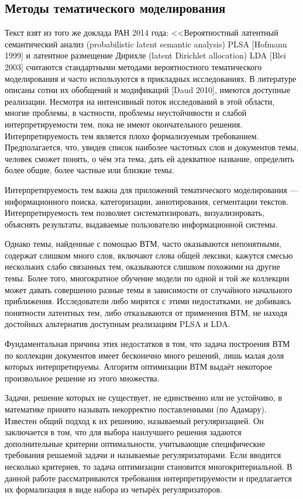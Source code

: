 \documentclass[a4paper,14pt]{extarticle}
\begin{document}
\subsection{Методы тематического моделирования}
Текст взят из того же доклада РАН 2014 года: <<Вероятностный латентный семантический анализ (probabilistic latent semantic
analysis) PLSA [Hofmann 1999] и латентное размещение Дирихле (latent Dirichlet
allocation) LDA [Blei 2003] считаются стандартными методами вероятностного
тематического моделирования и часто используются в прикладных исследованиях.
В литературе описаны сотни их обобщений и модификаций [Daud 2010], имеются
доступные реализации. Несмотря на интенсивный поток исследований в этой
области, многие проблемы, в частности, проблемы неустойчивости и слабой
интерпретируемости тем, пока не имеют окончательного решения.
Интерпретируемость тем является плохо формализуемым требованием.
Предполагается, что, увидев список наиболее частотных слов и документов темы,
человек сможет понять, о чём эта тема, дать ей адекватное название, определить
более общие, более частные или близкие темы.

 Интерпретируемость тем важна для
приложений тематического моделирования — информационного поиска,
категоризации, аннотирования, сегментации текстов. Интерпретируемость тем
позволяет систематизировать, визуализировать, объяснять результаты,
выдаваемые пользователю информационной системы.


Однако темы, найденные с помощью ВТМ, часто оказываются непонятными,
содержат слишком много слов, включают слова общей лексики, кажутся смесью
нескольких слабо связанных тем, оказываются слишком похожими на другие темы.
Более того, многократное обучение модели по одной и той же коллекции может
давать совершенно разные темы в зависимости от случайного начального
приближения. Исследователи либо мирятся с этими недостатками, не добиваясь
понятности латентных тем, либо отказываются от применения ВТМ, не находя
достойных альтернатив доступным реализациям PLSA и LDA.


Фундаментальная причина этих недостатков в том, что задача построения ВТМ
по коллекции документов имеет бесконечно много решений, лишь малая доля
которых интерпретируемы. Алгоритм оптимизации ВТМ выдаёт некоторое
произвольное решение из этого множества.

Задачи, решение которых не существует, не единственно или не устойчиво, в
математике принято называть некорректно поставленными (по Адамару). Известен
общий подход к их решению, называемый регуляризацией. Он заключается в том,
что для выбора наилучшего решения задаются дополнительные критерии
оптимальности, учитывающие специфические требования решаемой задачи и
называемые регуляризаторами. Если вводится несколько критериев, то задача
оптимизации становится многокритериальной. В данной работе рассматриваются
требования интерпретируемости и предлагается их формализация в виде набора из
четырёх регуляризаторов.
\end{document}
